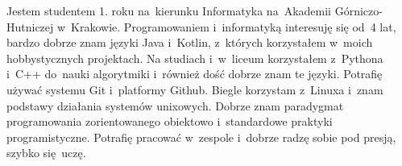 \documentclass[8pt]{developercv} %
\begin{document}


\begin{minipage}[t]{0.5\textwidth} %
  \vspace{-\baselineskip} %
  Jestem studentem 1. roku na~kierunku Informatyka na~Akademii Górniczo-Hutniczej w~Krakowie.
  Programowaniem i~informatyką interesuję się od~4 lat, bardzo dobrze znam języki
  Java i~Kotlin, z~których korzystałem w~moich hobbystycznych projektach.
  Na studiach i~w~liceum korzystałem z~Pythona i~C++ do~nauki algorytmiki
  i~również dość dobrze znam te języki.
  Potrafię używać systemu Git i~platformy Github.
  Biegle korzystam z~Linuxa i~znam podstawy działania systemów unixowych.
  Dobrze znam paradygmat programowania zorientowanego obiektowo i~standardowe praktyki programistyczne.
  Potrafię pracować w~zespole i~dobrze radzę sobie pod presją, szybko się~uczę.

\end{minipage}
\hfill %
\begin{minipage}[t]{0.45\textwidth} %
	\vspace{-\baselineskip} %
	\begin{barchart}{5.5}
	\end{barchart}
\end{minipage}


\end{document}
